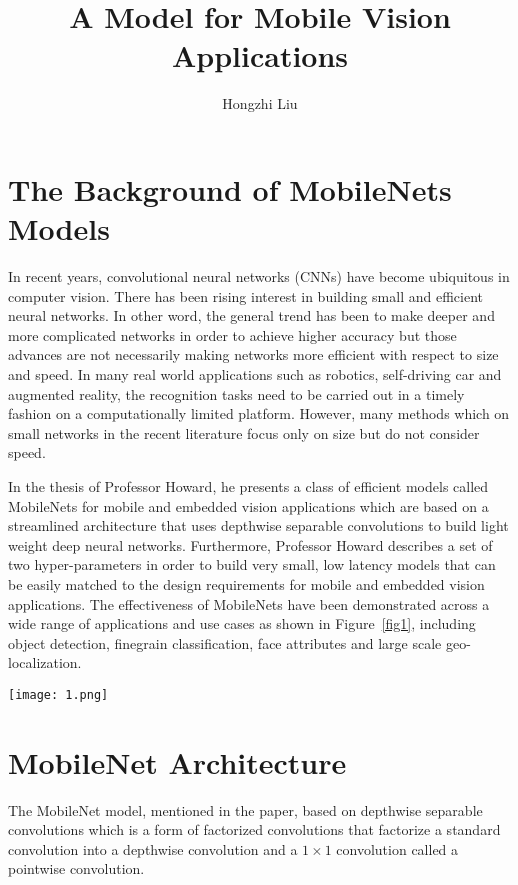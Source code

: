 \documentclass[twocolumn]{article}
\author{Hongzhi Liu}
\title{A Model for Mobile Vision Applications}
\begin{document}
	\maketitle
	\par
	\section{The Background of MobileNets Models}
	In recent years, convolutional neural networks (CNNs) have become ubiquitous in computer vision. There has been rising interest in building small and efficient neural networks. In other word, the general trend has been to make deeper and more complicated networks in order to achieve higher accuracy but those advances are not necessarily making networks more efficient with respect to size and speed. In many real world applications such as robotics, self-driving car and augmented reality, the recognition tasks need to be carried out in a timely fashion on a computationally limited platform. However, many methods which on small networks in the recent literature \cite{DBLP:journals/corr/IandolaMAHDK16,DBLP:journals/corr/JinDC14,Rastegari2016XNOR} focus only on size but do not consider speed.
	
	In the thesis of Professor Howard, he presents a class of efficient models called MobileNets for mobile and embedded vision applications \cite{DBLP:journals/corr/HowardZCKWWAA17} which are based on a streamlined architecture that uses depthwise separable convolutions to build light weight deep neural networks. Furthermore, Professor Howard describes a set of two hyper-parameters in order to build very small, low latency models that can be easily matched to the design requirements for mobile and embedded vision applications. The effectiveness of MobileNets have been demonstrated across a wide range of applications and use cases as shown in Figure~\ref{fig1}, including object detection, finegrain classification, face attributes and large scale geo-localization.
	\begin{figure*}[htbp!] 
		\begin{center} 
			\texttt{[image: 1.png]} 
			\caption{MobileNet models can be applied to various recognition tasks for efficient on device intelligence.}\label{fig1}  
		\end{center}   
	\end{figure*}
	
	\section{MobileNet Architecture}
	The MobileNet model, mentioned in the paper, based on depthwise separable convolutions which is a form of factorized convolutions that factorize a standard convolution into a depthwise convolution and a $1\times 1$ convolution called a pointwise convolution. 
	
\end{document}
